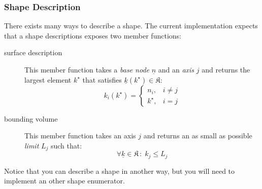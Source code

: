 \documentclass{article}
\begin{document}
\subsubsection{Shape Description}
There exists many ways to describe a shape.  The current
implementation expects that a shape descriptions exposes two member
functions:
\begin{description}
\item [surface description] This member function takes a \emph{base
    node} \( \underline{n} \)
  and an \emph{axis} \(j\)
  and returns the largest element \( k^\star \)
  that satisfies \( \underline{k}(k^\star) \in \mathfrak{K} \):
  \[ k_i(k^\star) =
    \begin{cases}
      n_i,& i \neq j\\
      k^\star, & i = j
    \end{cases}
  \]
\item [bounding volume] This member function takes an axis \(j\)
  and returns an as small as possible \emph{limit} \( L_j \)
  such that:
  \[ \forall \underline{k} \in \mathfrak{K} \,\colon\; k_j \leq L_j \]
\end{description}


Notice that you can describe a shape in another way, but you will need
to implement an other shape enumerator.
\end{document}
